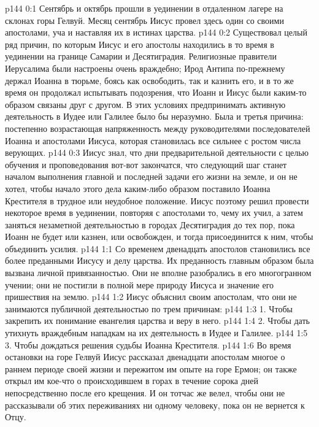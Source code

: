 \author{Комиссия срединников}
\vs p144 0:1 Сентябрь и октябрь прошли в уединении в отдаленном лагере на склонах горы Гелвуй. Месяц сентябрь Иисус провел здесь один со своими апостолами, уча и наставляя их в истинах царства.
\vs p144 0:2 Существовал целый ряд причин, по которым Иисус и его апостолы находились в то время в уединении на границе Самарии и Десятиградия. Религиозные правители Иерусалима были настроены очень враждебно; Ирод Антипа по\hyp{}прежнему держал Иоанна в тюрьме, боясь как освободить, так и казнить его, и в то же время он продолжал испытывать подозрения, что Иоанн и Иисус были каким\hyp{}то образом связаны друг с другом. В этих условиях предпринимать активную деятельность в Иудее или Галилее было бы неразумно. Была и третья причина: постепенно возрастающая напряженность между руководителями последователей Иоанна и апостолами Иисуса, которая становилась все сильнее с ростом числа верующих.
\vs p144 0:3 Иисус знал, что дни предварительной деятельности с целью обучения и проповедования вот\hyp{}вот закончатся, что следующий шаг станет началом выполнения главной и последней задачи его жизни на земле, и он не хотел, чтобы начало этого дела каким\hyp{}либо образом поставило Иоанна Крестителя в трудное или неудобное положение. Иисус поэтому решил провести некоторое время в уединении, повторяя с апостолами то, чему их учил, а затем заняться незаметной деятельностью в городах Десятиградия до тех пор, пока Иоанн не будет или казнен, или освобожден, и тогда присоединится к ним, чтобы объединить усилия.
\vs p144 1:1 Со временем двенадцать апостолов становились все более преданными Иисусу и делу царства. Их преданность главным образом была вызвана личной привязанностью. Они не вполне разобрались в его многогранном учении; они не постигли в полной мере природу Иисуса и значение его пришествия на землю.
\vs p144 1:2 Иисус объяснил своим апостолам, что они не занимаются публичной деятельностью по трем причинам:
\vs p144 1:3 1. Чтобы закрепить их понимание евангелия царства и веру в него.
\vs p144 1:4 2. Чтобы дать утихнуть враждебным нападкам на их деятельность в Иудее и Галилее.
\vs p144 1:5 3. Чтобы дождаться решения судьбы Иоанна Крестителя.
\vs p144 1:6 Во время остановки на горе Гелвуй Иисус рассказал двенадцати апостолам многое о раннем периоде своей жизни и пережитом им опыте на горе Ермон; он также открыл им кое\hyp{}что о происходившем в горах в течение сорока дней непосредственно после его крещения. И он тотчас же велел, чтобы они не рассказывали об этих переживаниях ни одному человеку, пока он не вернется к Отцу.
